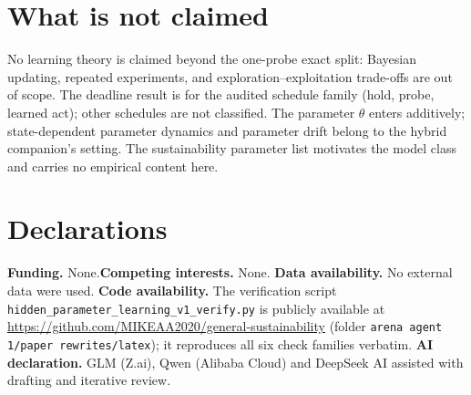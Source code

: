 \documentclass[10pt,twocolumn]{article}
\theoremstyle{definition}
\begin{document}
\section{What is not claimed}

No learning theory is claimed beyond the one-probe exact split:
Bayesian updating, repeated experiments, and exploration--exploitation
trade-offs are out of scope. The deadline result is for the audited
schedule family (hold, probe, learned act); other schedules are not
classified. The parameter $\theta$ enters additively; state-dependent
parameter dynamics and parameter drift belong to the hybrid companion's
setting. The sustainability parameter list motivates the model class and
carries no empirical content here.


\section*{Declarations}
\textbf{Funding.} None.\quad \textbf{Competing interests.} None.\quad
\textbf{Data availability.} No external data were used.\quad
\textbf{Code availability.} The verification script
\texttt{hidden\_parameter\_learning\_v1\_verify.py} is publicly available at
\url{https://github.com/MIKEAA2020/general-sustainability} (folder
\texttt{arena agent 1/paper rewrites/latex}); it reproduces all six check
families verbatim.\quad
\textbf{AI declaration.} GLM (Z.ai), Qwen (Alibaba Cloud) and DeepSeek AI
assisted with drafting and iterative review.
\end{document}
